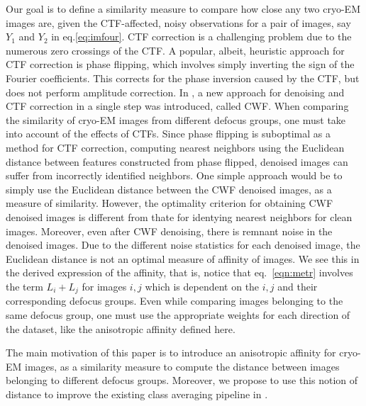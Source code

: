 \documentclass{article}
\begin{document}
Our goal is to define a similarity measure to compare how close any two cryo-EM images are, given the CTF-affected, noisy observations for a pair of images, say $Y_1$ and $Y_2$ in eq.\ref{eq:imfour}.
CTF correction is a challenging problem due to the numerous zero crossings of the CTF. A popular, albeit, heuristic approach for CTF correction is phase flipping, which involves simply inverting the sign of the Fourier coefficients. This corrects for the phase inversion caused by the CTF, but does not perform amplitude correction. In \cite{cwf}, a new approach for denoising and CTF correction in a single step was introduced, called CWF. When comparing the similarity of cryo-EM images from different defocus groups, one must take into account of the effects of CTFs. Since phase flipping is suboptimal as a method for CTF correction, computing nearest neighbors using the Euclidean distance between features constructed from phase flipped, denoised images can suffer from incorrectly identified neighbors. One simple approach would be to simply use the Euclidean distance between the CWF denoised images, as a measure of similarity. However, the optimality criterion for obtaining CWF denoised images is different from thate for identying nearest neighbors for clean images. Moreover, even after CWF denoising, there is remnant noise in the denoised images. Due to the different noise statistics for each denoised image, the Euclidean distance is not an optimal measure of affinity of images. We see this in the derived expression of the affinity, that is, notice that eq.~\eqref{eqn:metr} involves the term $L_i + L_j$ for images $i,j$ which is dependent on the $i,j$ and their corresponding defocus groups. Even while comparing images belonging to the same defocus group, one must use the appropriate weights for each direction of the dataset, like the anisotropic affinity defined here.

The main motivation of this paper is to introduce an anisotropic affinity for cryo-EM images, as a similarity measure to compute the distance between images belonging to different defocus groups. Moreover, we propose to use this notion of distance to improve the existing class averaging pipeline in \cite{zhao}.
\end{document}
